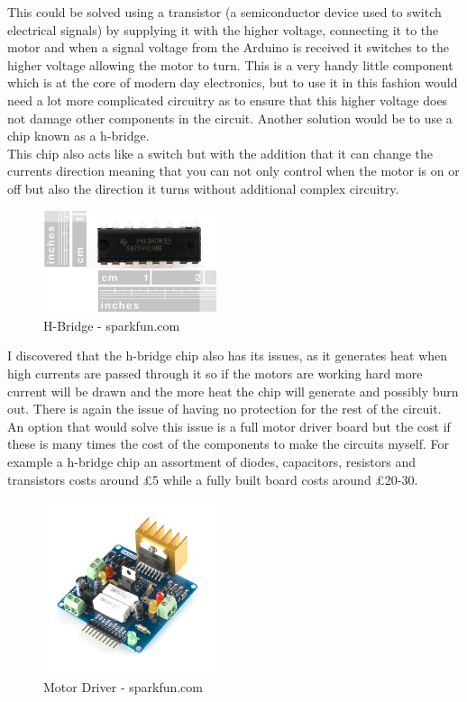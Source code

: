 This could be solved using a transistor (a semiconductor device used to switch electrical signals) by supplying it with the higher voltage, connecting it to the motor and when a signal voltage from the Arduino is received it switches to the higher voltage allowing the motor to turn.  This is a very handy little component which is at the core of modern day electronics, but to use it in this fashion would need a lot more complicated circuitry as to ensure that this higher voltage does not damage other components in the circuit.  Another solution would be to use a chip known as a h-bridge.
\\This chip also acts like a switch but with the addition that it can change the currents direction meaning that you can not only control when the motor is on or off but also the direction it turns without additional complex circuitry.
\begin{figure}[H]
\centering
	\includegraphics[width=2.0in]  {Images/h-bridge.jpg}
	\caption{H-Bridge - sparkfun.com}
	\label{H-Bridge}
\end{figure}
I discovered that the h-bridge chip also has its issues, as it generates heat when high currents are passed through it so if the motors are working hard more current will be drawn and the more heat the chip will generate and possibly burn out.  There is again the issue of having no protection for the rest of the circuit.  An option that would solve this issue is a full motor driver board but the cost if these is many times the cost of the components to make the circuits myself.  For example a h-bridge chip an assortment of diodes, capacitors, resistors and transistors costs around \pounds5 while a fully built board costs around \pounds20-30.
\begin{figure}[H]
\centering
        \includegraphics[width=2.0in]  {Images/motor-driver.jpg}
        \caption{Motor Driver - sparkfun.com}
        \label{Motor Driver}
\end{figure}
